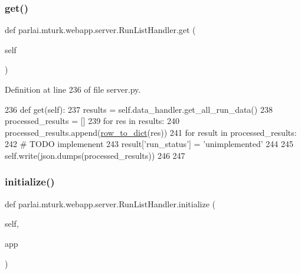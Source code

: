 \subsubsection{\texorpdfstring{get()}{get()}}
{\footnotesize\ttfamily def parlai.\+mturk.\+webapp.\+server.\+Run\+List\+Handler.\+get (\begin{DoxyParamCaption}\item[{}]{self }\end{DoxyParamCaption})}



Definition at line 236 of file server.\+py.


\begin{DoxyCode}
236     \textcolor{keyword}{def }get(self):
237         results = self.data\_handler.get\_all\_run\_data()
238         processed\_results = []
239         \textcolor{keywordflow}{for} res \textcolor{keywordflow}{in} results:
240             processed\_results.append(\hyperlink{namespaceparlai_1_1mturk_1_1webapp_1_1server_a92be47964fa33a4b6a14d4069d091c7d}{row\_to\_dict}(res))
241         \textcolor{keywordflow}{for} result \textcolor{keywordflow}{in} processed\_results:
242             \textcolor{comment}{# TODO implemenent}
243             result[\textcolor{stringliteral}{'run\_status'}] = \textcolor{stringliteral}{'unimplemented'}
244 
245         self.write(json.dumps(processed\_results))
246 
247 
\end{DoxyCode}
\mbox{\label{classparlai_1_1mturk_1_1webapp_1_1server_1_1RunListHandler_aea5350b7ea1536cacfc3dfff4ffe1f32}} 
\subsubsection{\texorpdfstring{initialize()}{initialize()}}
{\footnotesize\ttfamily def parlai.\+mturk.\+webapp.\+server.\+Run\+List\+Handler.\+initialize (\begin{DoxyParamCaption}\item[{}]{self,  }\item[{}]{app }\end{DoxyParamCaption})}



